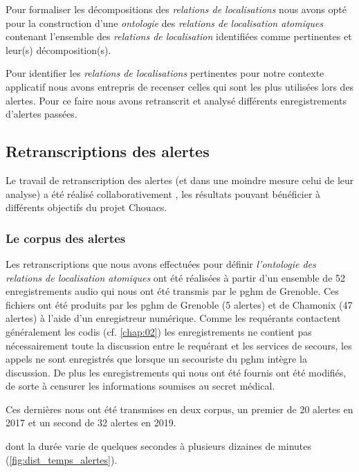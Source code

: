 Pour formaliser les décompositions des \emph{relations de
  localisations} nous avons opté pour la construction d'une
\emph{ontologie} des \emph{relations de localisation atomiques}
contenant l'ensemble des \emph{relations de localisation} identifiées
comme pertinentes et leur(s) décomposition(s).


Pour identifier les \emph{relations de localisations} pertinentes pour
notre contexte applicatif nous avons entrepris de recenser celles qui
sont les plus utilisées lors des alertes. Pour ce faire nous avons
retranscrit et analysé différents enregistrements d'alertes passées.

\subsection{Retranscriptions des alertes}

Le travail de retranscription des alertes (et dans une moindre mesure
celui de leur analyse) a été réalisé collaborativement
\autocite{Bunel2019}, les résultats pouvant bénéficier à différents
objectifs du projet Chouacs.

\subsubsection{Le corpus des alertes}

Les retranscriptions que nous avons effectuées pour définir
\emph{l'ontologie des relations de localisation atomiques} ont été
réalisées à partir d'un ensemble de 52 enregistrements audio qui nous
ont été transmis par le \ac{pghm} de Grenoble. Ces fichiers ont été
produits par les \ac{pghm} de Grenoble (5 alertes) et de Chamonix (47
alertes) à l'aide d'un enregistreur numérique. Comme les requérants
contactent généralement les \ac{codis} (cf. \autoref{chap:02}) les
enregistrements ne contient pas nécessairement toute la discussion
entre le requérant et les services de secours, les appels ne sont
enregistrés que lorsque un secouriste du \ac{pghm} intègre la
discussion. De plus les enregistrements qui nous ont été fournis ont
été modifiés, de sorte à censurer les informations soumises au secret
médical.

Ces dernières nous ont été transmises en deux corpus, un premier de 20
alertes en 2017 et un second de 32 alertes en 2019.

dont la durée varie de quelques secondes à plusieurs dizaines de
minutes (\autoref{fig:dist_temps_alertes}).

